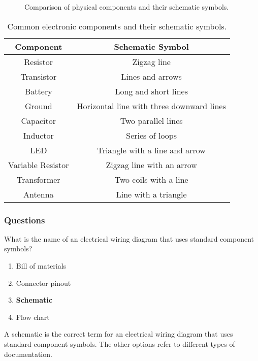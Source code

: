 \begin{figure}[h]
    \centering
    \caption{Comparison of physical components and their schematic symbols.}
    \label{fig:component-symbols}
\end{figure}

\begin{table}[h]
    \centering
    \begin{tabular}{|c|c|}
        \hline
        \textbf{Component} & \textbf{Schematic Symbol} \\
        \hline
        Resistor & Zigzag line \\
        Transistor & Lines and arrows \\
        Battery & Long and short lines \\
        Ground & Horizontal line with three downward lines \\
        Capacitor & Two parallel lines \\
        Inductor & Series of loops \\
        LED & Triangle with a line and arrow \\
        Variable Resistor & Zigzag line with an arrow \\
        Transformer & Two coils with a line \\
        Antenna & Line with a triangle \\
        \hline
    \end{tabular}
    \caption{Common electronic components and their schematic symbols.}
    \label{tab:component-symbols}
\end{table}

\subsubsection*{Questions}

\begin{tcolorbox}[colback=gray!10!white,colframe=black!75!black,title={T6C01}]
    What is the name of an electrical wiring diagram that uses standard component symbols?
    \begin{enumerate}[label=\Alph*),noitemsep]
        \item Bill of materials
        \item Connector pinout
        \item \textbf{Schematic}
        \item Flow chart
    \end{enumerate}
\end{tcolorbox}
A schematic is the correct term for an electrical wiring diagram that uses standard component symbols. The other options refer to different types of documentation.

